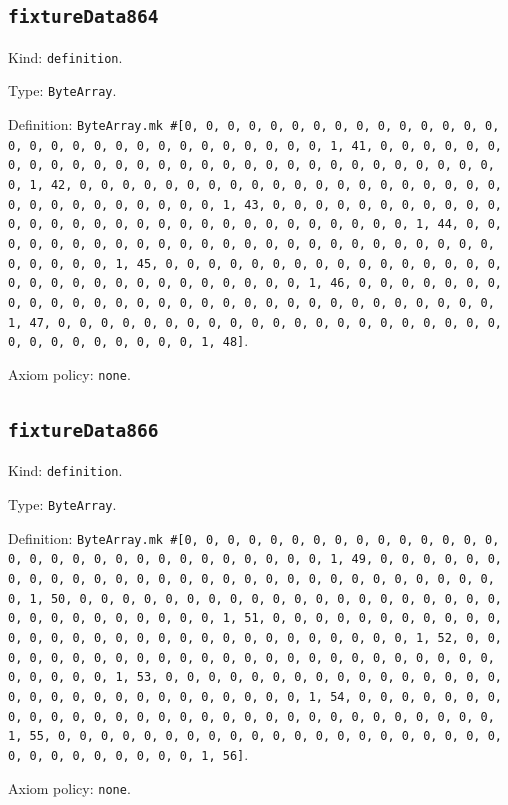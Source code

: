 \documentclass[11pt]{article}
\begin{document}
\subsection*{\texttt{fixtureData864}}
\noindent Kind: \texttt{definition}.\par
\noindent Type: \texttt{ByteArray}.\par
\noindent Definition: \texttt{ByteArray.mk \#[0, 0, 0, 0, 0, 0, 0, 0, 0, 0, 0, 0, 0, 0, 0, 0, 0, 0, 0, 0, 0, 0, 0, 0, 0, 0, 0, 0, 0, 0, 1, 41, 0, 0, 0, 0, 0, 0, 0, 0, 0, 0, 0, 0, 0, 0, 0, 0, 0, 0, 0, 0, 0, 0, 0, 0, 0, 0, 0, 0, 0, 0, 1, 42, 0, 0, 0, 0, 0, 0, 0, 0, 0, 0, 0, 0, 0, 0, 0, 0, 0, 0, 0, 0, 0, 0, 0, 0, 0, 0, 0, 0, 0, 0, 1, 43, 0, 0, 0, 0, 0, 0, 0, 0, 0, 0, 0, 0, 0, 0, 0, 0, 0, 0, 0, 0, 0, 0, 0, 0, 0, 0, 0, 0, 0, 0, 1, 44, 0, 0, 0, 0, 0, 0, 0, 0, 0, 0, 0, 0, 0, 0, 0, 0, 0, 0, 0, 0, 0, 0, 0, 0, 0, 0, 0, 0, 0, 0, 1, 45, 0, 0, 0, 0, 0, 0, 0, 0, 0, 0, 0, 0, 0, 0, 0, 0, 0, 0, 0, 0, 0, 0, 0, 0, 0, 0, 0, 0, 0, 0, 1, 46, 0, 0, 0, 0, 0, 0, 0, 0, 0, 0, 0, 0, 0, 0, 0, 0, 0, 0, 0, 0, 0, 0, 0, 0, 0, 0, 0, 0, 0, 0, 1, 47, 0, 0, 0, 0, 0, 0, 0, 0, 0, 0, 0, 0, 0, 0, 0, 0, 0, 0, 0, 0, 0, 0, 0, 0, 0, 0, 0, 0, 0, 0, 1, 48]}.\par
\noindent Axiom policy: \texttt{none}.\par
\subsection*{\texttt{fixtureData866}}
\noindent Kind: \texttt{definition}.\par
\noindent Type: \texttt{ByteArray}.\par
\noindent Definition: \texttt{ByteArray.mk \#[0, 0, 0, 0, 0, 0, 0, 0, 0, 0, 0, 0, 0, 0, 0, 0, 0, 0, 0, 0, 0, 0, 0, 0, 0, 0, 0, 0, 0, 0, 1, 49, 0, 0, 0, 0, 0, 0, 0, 0, 0, 0, 0, 0, 0, 0, 0, 0, 0, 0, 0, 0, 0, 0, 0, 0, 0, 0, 0, 0, 0, 0, 1, 50, 0, 0, 0, 0, 0, 0, 0, 0, 0, 0, 0, 0, 0, 0, 0, 0, 0, 0, 0, 0, 0, 0, 0, 0, 0, 0, 0, 0, 0, 0, 1, 51, 0, 0, 0, 0, 0, 0, 0, 0, 0, 0, 0, 0, 0, 0, 0, 0, 0, 0, 0, 0, 0, 0, 0, 0, 0, 0, 0, 0, 0, 0, 1, 52, 0, 0, 0, 0, 0, 0, 0, 0, 0, 0, 0, 0, 0, 0, 0, 0, 0, 0, 0, 0, 0, 0, 0, 0, 0, 0, 0, 0, 0, 0, 1, 53, 0, 0, 0, 0, 0, 0, 0, 0, 0, 0, 0, 0, 0, 0, 0, 0, 0, 0, 0, 0, 0, 0, 0, 0, 0, 0, 0, 0, 0, 0, 1, 54, 0, 0, 0, 0, 0, 0, 0, 0, 0, 0, 0, 0, 0, 0, 0, 0, 0, 0, 0, 0, 0, 0, 0, 0, 0, 0, 0, 0, 0, 0, 1, 55, 0, 0, 0, 0, 0, 0, 0, 0, 0, 0, 0, 0, 0, 0, 0, 0, 0, 0, 0, 0, 0, 0, 0, 0, 0, 0, 0, 0, 0, 0, 1, 56]}.\par
\noindent Axiom policy: \texttt{none}.\par
\end{document}
